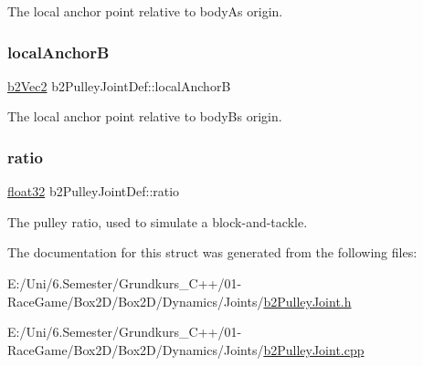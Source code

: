 The local anchor point relative to bodyA\textquotesingle{}s origin. 

\mbox{\label{structb2_pulley_joint_def_aed3f9c9f5f4145ceb32e7e164de73144}} 
\subsubsection{\texorpdfstring{localAnchorB}{localAnchorB}}
{\footnotesize\ttfamily \mbox{\hyperlink{structb2_vec2}{b2\+Vec2}} b2\+Pulley\+Joint\+Def\+::local\+AnchorB}



The local anchor point relative to bodyB\textquotesingle{}s origin. 

\mbox{\label{structb2_pulley_joint_def_af35074246aeacbf239c11682642b31f5}} 
\subsubsection{\texorpdfstring{ratio}{ratio}}
{\footnotesize\ttfamily \mbox{\hyperlink{b2_settings_8h_aacdc525d6f7bddb3ae95d5c311bd06a1}{float32}} b2\+Pulley\+Joint\+Def\+::ratio}



The pulley ratio, used to simulate a block-\/and-\/tackle. 



The documentation for this struct was generated from the following files\+:\begin{DoxyCompactItemize}
\item 
E\+:/\+Uni/6.\+Semester/\+Grundkurs\+\_\+\+C++/01-\/\+Race\+Game/\+Box2\+D/\+Box2\+D/\+Dynamics/\+Joints/\mbox{\hyperlink{b2_pulley_joint_8h}{b2\+Pulley\+Joint.\+h}}\item 
E\+:/\+Uni/6.\+Semester/\+Grundkurs\+\_\+\+C++/01-\/\+Race\+Game/\+Box2\+D/\+Box2\+D/\+Dynamics/\+Joints/\mbox{\hyperlink{b2_pulley_joint_8cpp}{b2\+Pulley\+Joint.\+cpp}}\end{DoxyCompactItemize}
